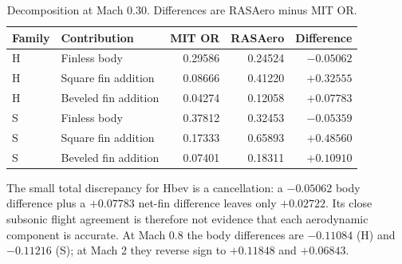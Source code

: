 \documentclass[oneside,openany]{amsdtx}
\begin{document}
\begin{table}[H]\centering\small\renewcommand{\arraystretch}{1.15}
\caption{Decomposition at Mach 0.30. Differences are RASAero minus MIT OR.}\label{tab:aerodecomp}
\begin{tabular}{@{}llrrr@{}}\toprule
Family & Contribution & MIT OR & RASAero & Difference\\\midrule
H & Finless body & 0.29586 & 0.24524 & $-0.05062$\\
H & Square fin addition & 0.08666 & 0.41220 & $+0.32555$\\
H & Beveled fin addition & 0.04274 & 0.12058 & $+0.07783$\\
S & Finless body & 0.37812 & 0.32453 & $-0.05359$\\
S & Square fin addition & 0.17333 & 0.65893 & $+0.48560$\\
S & Beveled fin addition & 0.07401 & 0.18311 & $+0.10910$\\\bottomrule
\end{tabular}\end{table}

The small total discrepancy for Hbev is a cancellation: a $-0.05062$ body difference plus a $+0.07783$ net-fin difference leaves only $+0.02722$. Its close subsonic flight agreement is therefore not evidence that each aerodynamic component is accurate. At Mach 0.8 the body differences are $-0.11084$ (H) and $-0.11216$ (S); at Mach 2 they reverse sign to $+0.11848$ and $+0.06843$.
\end{document}

